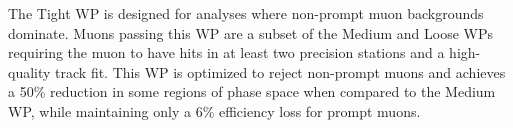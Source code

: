 The Tight WP is designed for analyses where non-prompt muon backgrounds dominate. Muons passing this WP are a subset of the Medium and Loose WPs requiring the muon to have hits in at least two precision stations and a high-quality track fit. This WP is optimized to reject non-prompt muons and achieves a 50\% reduction in some regions of phase space when compared to the Medium WP, while maintaining only a 6\% efficiency loss for prompt muons. 

